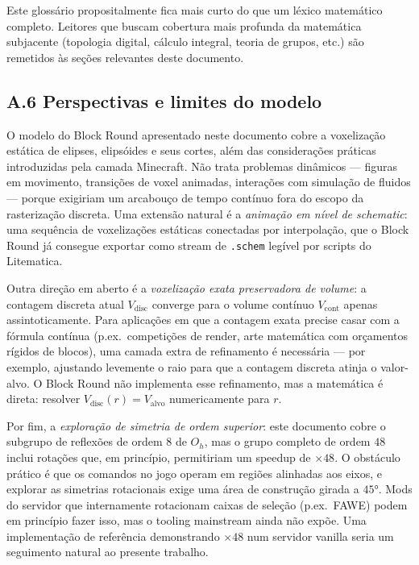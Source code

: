 \documentclass[12pt,a4paper]{scrartcl}
\newcommand{\code}[1]{\texttt{\small #1}}
\begin{document}
Este glossário propositalmente fica mais curto do que um léxico matemático completo. Leitores que buscam cobertura mais profunda da matemática subjacente (topologia digital, cálculo integral, teoria de grupos, etc.) são remetidos às seções relevantes deste documento.

\subsection*{A.6 Perspectivas e limites do modelo}

O modelo do Block Round apresentado neste documento cobre a voxelização estática de elipses, elipsóides e seus cortes, além das considerações práticas introduzidas pela camada Minecraft. Não trata problemas dinâmicos --- figuras em movimento, transições de voxel animadas, interações com simulação de fluidos --- porque exigiriam um arcabouço de tempo contínuo fora do escopo da rasterização discreta. Uma extensão natural é a \emph{animação em nível de schematic}: uma sequência de voxelizações estáticas conectadas por interpolação, que o Block Round já consegue exportar como stream de \code{.schem} legível por scripts do Litematica.

Outra direção em aberto é a \emph{voxelização exata preservadora de volume}: a contagem discreta atual $V_{\mathrm{disc}}$ converge para o volume contínuo $V_{\mathrm{cont}}$ apenas assintoticamente. Para aplicações em que a contagem exata precise casar com a fórmula contínua (p.ex.\ competições de render, arte matemática com orçamentos rígidos de blocos), uma camada extra de refinamento é necessária --- por exemplo, ajustando levemente o raio para que a contagem discreta atinja o valor-alvo. O Block Round não implementa esse refinamento, mas a matemática é direta: resolver $V_{\mathrm{disc}}(r) = V_{\mathrm{alvo}}$ numericamente para $r$.

Por fim, a \emph{exploração de simetria de ordem superior}: este documento cobre o subgrupo de reflexões de ordem $8$ de $O_h$, mas o grupo completo de ordem $48$ inclui rotações que, em princípio, permitiriam um speedup de $\times 48$. O obstáculo prático é que os comandos no jogo operam em regiões alinhadas aos eixos, e explorar as simetrias rotacionais exige uma área de construção girada a $45°$. Mods do servidor que internamente rotacionam caixas de seleção (p.ex.\ FAWE) podem em princípio fazer isso, mas o tooling mainstream ainda não expõe. Uma implementação de referência demonstrando $\times 48$ num servidor vanilla seria um seguimento natural ao presente trabalho.
\end{document}
